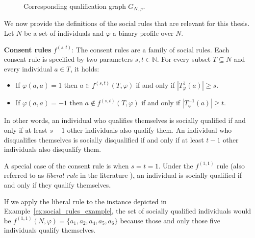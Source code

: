 \documentclass[
    12pt,               %
    a4paper,            %
    bibtotoc,           %
    pointlessnumbers,   %
    ngerman,            %
    titlepage,          %
    leqno,              %
    ]{scrarticle}       %
\newcommand\exref{Example~\ref}
\begin{document}
\begin{Example}
\begin{figure}[!h]
\begin{minipage}[b]{.6\textwidth}
{\begin{tikzpicture}[
    > = Stealth,
    shorten > = 1pt,
    auto,
    node distance = 2cm,
    main node/.style = {circle,draw}
]
\end{tikzpicture}
}
\caption*{Corresponding qualification graph $G_{N, \varphi}$.}

\end{minipage}
\end{figure}
\capstarttrue %
\end{Example}



We now provide the definitions of the social rules that are relevant for this thesis. Let $N$ be a set of individuals and $\varphi$ a binary profile over $N$.



\textbf{Consent rules} $f^{(s, t)}$: The consent rules are a family of social rules. Each consent rule is specified by two parameters $s, t \in \mathbb{N}$. For every subset $T \subseteq N$ and every individual $a \in T$, it holds:
\begin{itemize}[nolistsep]
\item
If $\varphi(a, a) = 1$
then $a \in f^{(s, t)}(T, \varphi)$ if and only if
$|T^1_\varphi(a)| \geq s$.
\item
If $\varphi(a, a) = -1$
then $a \not\in f^{(s, t)}(T, \varphi)$ if and only if
$|T^{-1}_\varphi(a)| \geq t$.
\end{itemize}

In other words, an individual who qualifies themselves is socially qualified if and only if at least $s-1$ other individuals also qualify them. An individual who disqualifies themselves is socially disqualified if and only if at least $t-1$ other individuals also disqualify them.

A special case of the consent rule is when $s = t = 1$. Under the $f^{(1, 1)}$ rule (also referred to as \emph{liberal rule} in the literature \cite{SS03}), an individual is socially qualified if and only if they qualify themselves.



If we apply the liberal rule to the instance depicted in \exref{ex:social_rules_example}, the set of socially qualified individuals would be $f^{(1, 1)}(N, \varphi) = \{ a_1, a_2, a_4, a_5, a_6 \}$ because those and only those five individuals qualify themselves.
\end{document}
